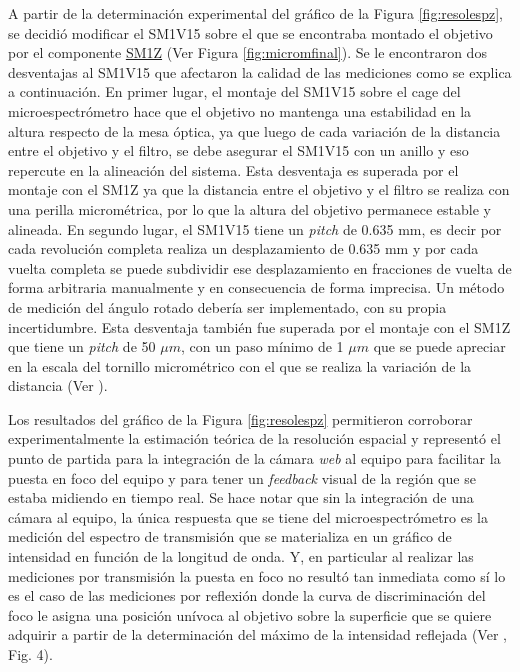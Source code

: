 A partir de la determinación experimental del gráfico de la Figura \ref{fig:resolespz}, se decidió modificar el SM1V15 sobre el que se encontraba montado el objetivo por el componente \href{https://www.thorlabs.com/thorProduct.cfm?partNumber=SM1Z#ad-image-0}{SM1Z} (Ver Figura \ref{fig:micromfinal}). Se le encontraron dos desventajas al SM1V15 que afectaron la calidad de las mediciones como se explica a continuación. En primer lugar, el montaje del SM1V15 sobre el cage del microespectrómetro hace que el objetivo no mantenga una estabilidad en la altura respecto de la mesa óptica, ya que luego de cada variación de la distancia entre el objetivo y el filtro, se debe asegurar el SM1V15 con un anillo y eso repercute en la alineación del sistema. Esta desventaja es superada por el montaje con el SM1Z ya que la distancia entre el objetivo y el filtro se realiza con una perilla micrométrica, por lo que la altura del objetivo permanece estable y alineada. En segundo lugar, el SM1V15 tiene un \textit{pitch} de 0.635 mm, es decir por cada revolución completa realiza un desplazamiento de 0.635 mm y por cada vuelta completa se puede subdividir ese desplazamiento en fracciones de vuelta de forma arbitraria manualmente y en consecuencia de forma imprecisa. Un método de medición del ángulo rotado debería ser implementado, con su propia incertidumbre. Esta desventaja también fue superada por el montaje con el SM1Z que tiene un \textit{pitch} de 50 $\mu m$, con un paso mínimo de 1 $\mu m$ que se puede apreciar en la escala del tornillo micrométrico con el que se realiza la variación de la distancia (Ver \href{https://www.thorlabs.com/images/ProductGallery/SM1Z/Z-Axis_Translation_Mount_30mm-AV3.jpg}{\faImage}). 

Los resultados del gráfico de la Figura \ref{fig:resolespz} permitieron corroborar experimentalmente la estimación teórica de la resolución espacial y representó el punto de partida para la integración de la cámara \textit{web} al equipo para facilitar la puesta en foco del equipo y para tener un \textit{feedback} visual de la región que se estaba midiendo en tiempo real. Se hace notar que sin la integración de una cámara al equipo, la única respuesta que se tiene del microespectrómetro es la medición del espectro de transmisión que se materializa en un gráfico de intensidad en función de la longitud de onda. Y, en particular al realizar las mediciones por transmisión la puesta en foco no resultó tan inmediata como sí lo es el caso de las mediciones por reflexión donde la curva de discriminación del foco le asigna una posición unívoca al objetivo sobre la superficie que se quiere adquirir a partir de la determinación del máximo de la intensidad reflejada (Ver \cite{mour}, Fig. 4). 

